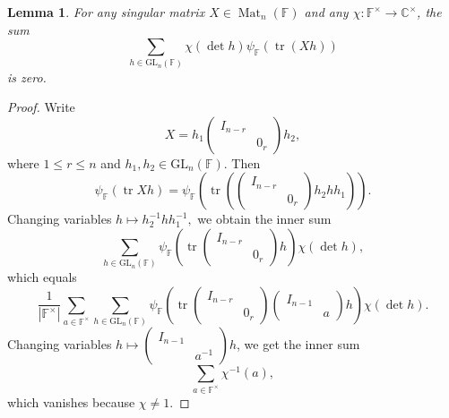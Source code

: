 \documentclass[12pt, reqno]{amsart}
\newtheorem{lemma}[theorem]{Lemma}
\theoremstyle{definition}
\theoremstyle{definition}
\theoremstyle{definition}
\newcommand{\cComplex}{\mathbb{C}}
\newcommand{\multiplicativegroup}[1]{#1^{\times}}
\newcommand{\sizeof}[1]{\left|#1\right|}
\newcommand{\fieldCharacter}{\psi}
\newcommand{\IdentityMatrix}[1]{I_{#1}}
\newcommand{\trace}{\operatorname{tr}}
\newcommand{\GL}{\mathrm{GL}}
\newcommand{\finiteField}{\mathbb{F}}
\newcommand{\squareMatrix}{\operatorname{Mat}}
\begin{document}
\begin{lemma}\label{lem:sum-vanishes-for-singular-matrices}
	For any singular matrix $X \in \squareMatrix_n\left(\finiteField\right)$ and any $\chi \colon \multiplicativegroup{\finiteField} \to \multiplicativegroup{\cComplex}$, the sum
	$$\sum_{h \in \GL_n\left(\finiteField\right)} \chi\left(\det h\right) \fieldCharacter_{\finiteField}\left(\trace\left(Xh\right)\right)$$
	is zero.
\end{lemma}
\begin{proof}
	Write $$X = h_1 \begin{pmatrix}
		\IdentityMatrix{n-r}\\
		& 0_r
	\end{pmatrix} h_2,$$
	where $1 \le r \le n$ and $h_1, h_2 \in \GL_n\left(\finiteField\right)$. Then
	$$\fieldCharacter_{\finiteField}\left(\trace Xh\right) = \fieldCharacter_{\finiteField}\left(\trace\left( \begin{pmatrix}
		\IdentityMatrix{n-r}\\
		& 0_r
	\end{pmatrix} h_2 h h_1\right)\right).$$
	Changing variables $h \mapsto h_2^{-1} h h_1^{-1},$
	we obtain the inner sum
	$$\sum_{h \in \GL_n\left(\finiteField\right)} \fieldCharacter_{\finiteField}\left(\trace \begin{pmatrix}
		\IdentityMatrix{n-r}\\
		& 0_r
	\end{pmatrix} h \right) \chi\left(\det h\right),$$
	which equals
	$$\frac{1}{\sizeof{\multiplicativegroup{\finiteField}}} \sum_{a \in \multiplicativegroup{\finiteField}} \sum_{h \in \GL_n\left(\finiteField\right)} \fieldCharacter_{\finiteField}\left(\trace \begin{pmatrix}
		\IdentityMatrix{n-r}\\
		& 0_r
	\end{pmatrix} \begin{pmatrix}
		\IdentityMatrix{n-1}\\
		& a
	\end{pmatrix} h \right) \chi\left(\det h\right).$$
	Changing variables $h \mapsto \left(\begin{smallmatrix}
		\IdentityMatrix{n-1}\\
		& a^{-1}
	\end{smallmatrix}\right) h$, we get the inner sum $$\sum_{a \in \multiplicativegroup{\finiteField}} \chi^{-1}\left(a\right),$$
	which vanishes because $\chi \ne 1$.
\end{proof}
\end{document}
